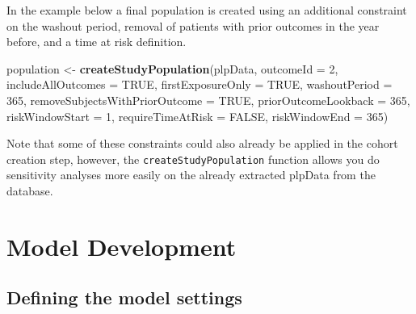 \documentclass[]{article}
\newenvironment{Shaded}{\begin{snugshade}}{\end{snugshade}}
\newcommand{\KeywordTok}[1]{\textcolor[rgb]{0.13,0.29,0.53}{\textbf{#1}}}
\newcommand{\DataTypeTok}[1]{\textcolor[rgb]{0.13,0.29,0.53}{#1}}
\newcommand{\DecValTok}[1]{\textcolor[rgb]{0.00,0.00,0.81}{#1}}
\newcommand{\StringTok}[1]{\textcolor[rgb]{0.31,0.60,0.02}{#1}}
\newcommand{\OtherTok}[1]{\textcolor[rgb]{0.56,0.35,0.01}{#1}}
\newcommand{\NormalTok}[1]{#1}
\begin{document}
In the example below a final population is created using an additional
constraint on the washout period, removal of patients with prior
outcomes in the year before, and a time at risk definition.

\begin{Shaded}
\begin{Highlighting}[]
\NormalTok{population <-}\StringTok{ }\KeywordTok{createStudyPopulation}\NormalTok{(plpData, }
\DataTypeTok{outcomeId =} \DecValTok{2}\NormalTok{, }
\DataTypeTok{includeAllOutcomes =} \OtherTok{TRUE}\NormalTok{, }
\DataTypeTok{firstExposureOnly =} \OtherTok{TRUE}\NormalTok{, }
\DataTypeTok{washoutPeriod =} \DecValTok{365}\NormalTok{, }
\DataTypeTok{removeSubjectsWithPriorOutcome =} \OtherTok{TRUE}\NormalTok{, }
\DataTypeTok{priorOutcomeLookback =} \DecValTok{365}\NormalTok{,}
\DataTypeTok{riskWindowStart =} \DecValTok{1}\NormalTok{,}
\DataTypeTok{requireTimeAtRisk =} \OtherTok{FALSE}\NormalTok{,}
\DataTypeTok{riskWindowEnd =} \DecValTok{365}\NormalTok{)}
\end{Highlighting}
\end{Shaded}

Note that some of these constraints could also already be applied in the
cohort creation step, however, the \texttt{createStudyPopulation}
function allows you do sensitivity analyses more easily on the already
extracted plpData from the database.

\newpage

\section{Model Development}\label{model-development}

\subsection{Defining the model
settings}\label{defining-the-model-settings}
\end{document}
